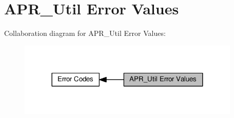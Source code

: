 \hypertarget{group__APR__Util__Error}{}\section{A\+P\+R\+\_\+\+Util Error Values}
\label{group__APR__Util__Error}
Collaboration diagram for A\+P\+R\+\_\+\+Util Error Values\+:
\nopagebreak
\begin{figure}[H]
\begin{center}
\leavevmode
\includegraphics[width=300pt]{group__APR__Util__Error}
\end{center}
\end{figure}
